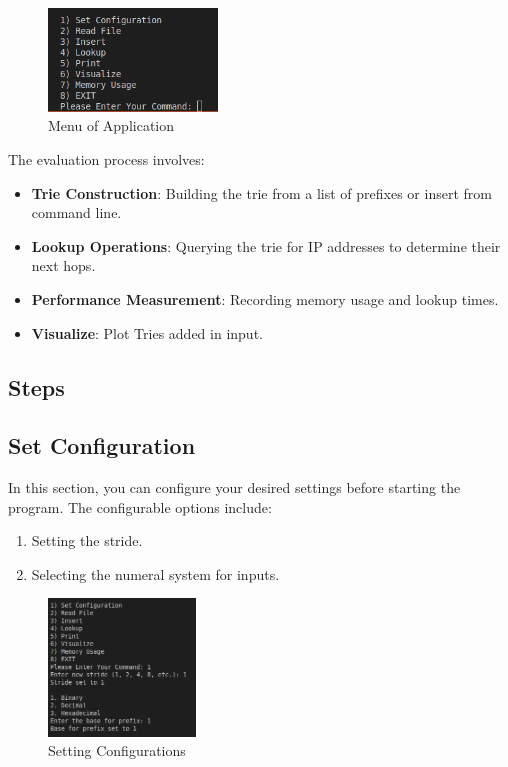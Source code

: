 \documentclass[12pt	]{article}
\begin{document}
\begin{figure}[h!]
	\centering
	\includegraphics[width=0.4\textwidth]{Images/img4.png}
	\caption{Menu of Application}
	\label{fig:Menu of Application}
\end{figure}




The evaluation process involves:
\begin{itemize}
	\item \textbf{Trie Construction}: Building the trie from a list of prefixes or insert from command line.
	\item \textbf{Lookup Operations}: Querying the trie for IP addresses to determine their next hops.
	\item \textbf{Performance Measurement}: Recording memory usage and lookup times.
	\item \textbf{Visualize}: Plot Tries added in input.
\end{itemize}

\subsection{Steps}

\subsection{Set Configuration}
In this section, you can configure your desired settings before starting the program.
The configurable options include:
\begin{enumerate}
	\item Setting the stride.	
	\item Selecting the numeral system for inputs.
\end{enumerate}

\begin{figure}[h!]
	\centering
	\includegraphics[width=0.35\textwidth]{Images/img5.png}
	\caption{Setting Configurations}
	\label{fig:Setting Configurations}
\end{figure}
\end{document}
